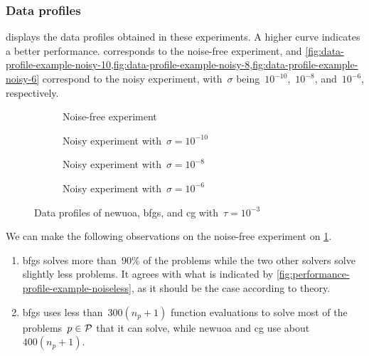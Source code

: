 \subsubsection{Data profiles}

 displays the data profiles obtained in these experiments.
A higher curve indicates a better performance.
 corresponds to the noise-free experiment, and \cref{fig:data-profile-example-noisy-10,fig:data-profile-example-noisy-8,fig:data-profile-example-noisy-6} correspond to the noisy experiment, with~$\sigma$ being~$10^{-10}$,~$10^{-8}$, and~$10^{-6}$, respectively.

\begin{figure}[ht]
    \centering
    \begin{subfigure}[b]{0.49\textwidth}
        \centering
        \caption{Noise-free experiment}
        \label{fig:data-profile-example-noiseless}
    \end{subfigure}
    \hfill
    \begin{subfigure}[b]{0.49\textwidth}
        \centering
        \caption{Noisy experiment with~$\sigma = 10^{-10}$}
        \label{fig:data-profile-example-noisy-10}
    \end{subfigure}
    \par\bigskip
    \begin{subfigure}[b]{0.49\textwidth}
        \centering
        \caption{Noisy experiment with~$\sigma = 10^{-8}$}
        \label{fig:data-profile-example-noisy-8}
    \end{subfigure}
    \hfill
    \begin{subfigure}[b]{0.49\textwidth}
        \centering
        \caption{Noisy experiment with~$\sigma = 10^{-6}$}
        \label{fig:data-profile-example-noisy-6}
    \end{subfigure}
    \caption{Data profiles of \gls{newuoa}, \gls{bfgs}, and \gls{cg} with~$\tau = 10^{-3}$}
    \label{fig:data-profile-example}
\end{figure}

We can make the following observations on the noise-free experiment on \cref{fig:data-profile-example-noiseless}.
\begin{enumerate}
    \item \Gls{bfgs} solves more than~$90\%$ of the problems while the two other solvers solve slightly less problems.
    It agrees with what is indicated by \cref{fig:performance-profile-example-noiseless}, as it should be the case according to theory.
    \item \Gls{bfgs} uses less than~$300 (n_p + 1)$ function evaluations to solve most of the problems~$p \in \mathcal{P}$ that it can solve, while \gls{newuoa} and \gls{cg} use about~$400 (n_p + 1)$.
\end{enumerate}

